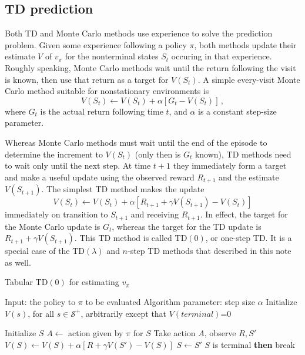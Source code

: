 \documentclass[12pt]{article}
\newcommand{\<}{\langle}
\renewcommand{\>}{\rangle}
\renewcommand{\S}{\mathcal{S}}
\begin{document}
\subsection{TD prediction}\label{subsec:prediction}

Both TD and Monte Carlo methods use experience to solve the prediction problem. Given some experience following a policy $\pi$, both methods update their estimate $V$ of $v_\pi$ for the
nonterminal states $S_t$ occuring in that experience. Roughly speaking, Monte Carlo methods wait until the return following the visit is known, then use that return as a target for $V(S_t)$. 
A simple every-visit Monte Carlo method suitable for nonstationary environments is
\begin{equation}
V(S_t) \leftarrow V(S_t) + \alpha [G_t - V(S_t)]\,,
\end{equation}
where $G_t$ is the actual return following time $t$, and $\alpha$ is a constant step-size parameter.

Whereas Monte Carlo methods must wait until the end of the episode to determine the increment to $V(S_t)$ (only then is $G_t$ known), TD methods need to wait only until the next step.
At time $t+1$ they immediately form a target and make a useful update using the observed reward $R_{t+1}$ and the estimate $V(S_{t+1})$. The simplest TD method makes the update 
\begin{equation}
V(S_t) \leftarrow V(S_t) + \alpha [ R_{t+1} + \gamma V(S_{t+1}) - V(S_t)]
\end{equation}
immediately on transition to $S_{t+1}$ and receiving $R_{t+1}$. In effect, the target for the Monte Carlo update is $G_t$, whereas the target for the TD update is $R_{t+1} + \gamma V(S_{t+1})$. This TD method is called TD$(0)$, or one-step TD. It is a special case of the TD$(\lambda)$ and $n$-step TD methods that described in this note as well.

\begin{algorithm}
\caption{Tabular TD$(0)$ for estimating $v_\pi$}
\begin{algorithmic}
\State Input: the policy to $\pi$ to be evaluated
\State Algorithm parameter: step size $\alpha$
\State Initialize $V(s)$, for all $s\in\S^+$, arbitrarily except that $V(terminal)$=0

\medskip
{}
  \State Initialize $S$
    \State $A\leftarrow$ action given by $\pi$ for $S$
    \State Take action $A$, observe $R,S'$
    \State $V(S)\leftarrow V(S) + \alpha [R + \gamma V(S') - V(S)]$
    \State $S\leftarrow S'$
     $S$ is terminal {\bf then} break
  \EndFor
\EndFor
\end{algorithmic}
\end{algorithm}
\end{document}
